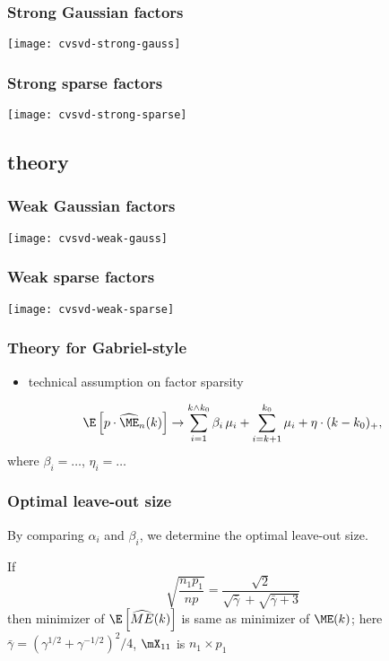 \documentclass[14pt]{beamer}
\begin{document}
\begin{frame}
  \frametitle{Strong Gaussian factors}
  \begin{center}
  \texttt{[image: cvsvd-strong-gauss]}
  \end{center}
\end{frame}

\begin{frame}
  \frametitle{Strong sparse factors}
  \begin{center}
  \texttt{[image: cvsvd-strong-sparse]}
  \end{center}
\end{frame}
\subsection{theory}

\begin{frame}
  \frametitle{Weak Gaussian factors}
  \begin{center}
  \texttt{[image: cvsvd-weak-gauss]}
  \end{center}
\end{frame}


\begin{frame}
  \frametitle{Weak sparse factors}
  \begin{center}
  \texttt{[image: cvsvd-weak-sparse]}
  \end{center}
\end{frame}

\begin{frame}
  \frametitle{Theory for Gabriel-style}
  \begin{itemize}
  \item technical assumption on factor sparsity
  \end{itemize}
  \begin{theorem}
  \[
\E \left[ p \cdot \widehat{\ME}_n(k) \right]
			\to
				\sum_{i=1}^{k \wedge k_0}
					\beta_i \, \mu_i
				+
				\sum_{i=k+1}^{k_0}
					\mu_i
				+
				\eta
				\cdot
				(k - k_0)_+,
  \]
  where $\beta_i = \ldots$, $\eta_i = \ldots$
  \end{theorem}
\end{frame}

\begin{frame}
  \frametitle{Optimal leave-out size}
  By comparing $\alpha_i$ and $\beta_i$, we determine the optimal leave-out size.
  \begin{theorem}
    If
    \[
       \sqrt{\frac{n_1 p_1}{n p}}
       =
       \frac{\sqrt{2}}{\sqrt{\bar \gamma} + \sqrt{\bar \gamma + 3}}
    \]
    then minimizer of $\E\left[\widehat{ME}(k)\right]$ is same as minimizer of $\ME(k)$;
    here
    \(
      \bar \gamma = (\gamma^{1/2} + \gamma^{-1/2})^2/4
    \),
    $\mX_{11}$ is $n_1 \times p_1$
  \end{theorem}
\end{frame}
\end{document}
